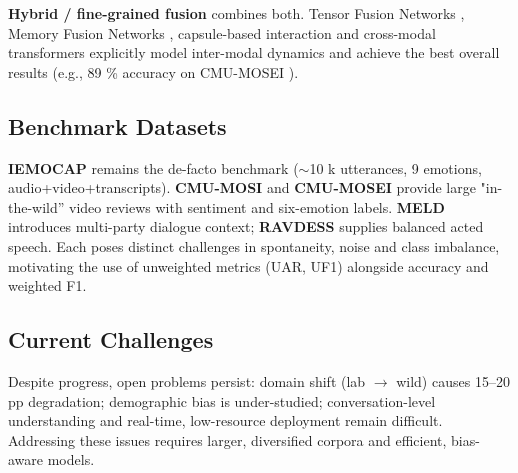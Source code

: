 \documentclass[12pt]{article}
\begin{document}
\textbf{Hybrid / fine-grained fusion} combines both.  Tensor Fusion
Networks \cite{zadeh2018multimodal_tfn}, Memory Fusion Networks
\cite{zadeh2018mfn}, capsule-based interaction
\cite{wang2019words} and cross-modal transformers
\cite{tsai2019mult} explicitly model inter-modal dynamics and achieve
the best overall results (e.g., 89 \% accuracy on CMU-MOSEI
\cite{mittal2020m3er}).

\subsection{Benchmark Datasets}
\textbf{IEMOCAP} \cite{busso2008iemocap} remains the de-facto benchmark
($\sim$10 k utterances, 9 emotions, audio+video+transcripts).  
\textbf{CMU-MOSI} \cite{zadeh2016mosi} and
\textbf{CMU-MOSEI} \cite{zadeh2018multimodal} provide large
"in-the-wild'' video reviews with sentiment and six-emotion labels.
\textbf{MELD} \cite{poria2018meld} introduces multi-party dialogue
context; \textbf{RAVDESS} \cite{livingstone2018ravdess} supplies
balanced acted speech.  Each poses distinct challenges in spontaneity,
noise and class imbalance, motivating the use of unweighted metrics
(UAR, UF1) alongside accuracy and weighted F1.

\subsection{Current Challenges}
Despite progress, open problems persist: domain shift (lab $\rightarrow$
wild) causes 15–20 pp degradation; demographic bias is under-studied;
conversation-level understanding and real-time, low-resource deployment
remain difficult.  Addressing these issues requires larger,
diversified corpora and efficient, bias-aware models.
\end{document}
